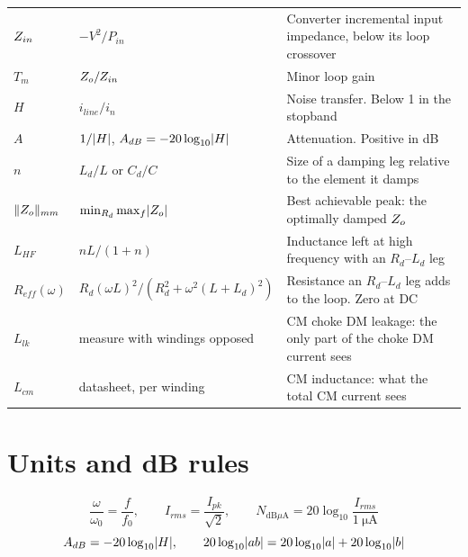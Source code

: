\begin{center}
\begin{tabular}{@{}lp{}p{}@{}}
		$Z_{in}$                 & $-V^2/P_{in}$                                & Converter incremental input impedance, below its loop crossover            \\
		$T_m$                  & $Z_o/Z_{in}$                                   & Minor loop gain                                                            \\
		$H$                    & $i_{line}/i_n$                               & Noise transfer. Below 1 in the stopband                                    \\
		$A$                    & $1/\lvert H\rvert$, $A_{dB} = -20\log_{10}\lvert H\rvert$  & Attenuation. Positive in dB                                                \\
		$n$                    & $L_d/L$ or $C_d/C$                           & Size of a damping leg relative to the element it damps                     \\
		$\lVert Z_o\rVert_{mm}$      & $\min_{R_d}\max_f \lvert Z_o\rvert$                 & Best achievable peak: the optimally damped $Z_o$                           \\
		$L_{HF}$               & $nL/(1+n)$                                   & Inductance left at high frequency with an $R_d$--$L_d$ leg                 \\
		$R_{eff}(\omega)$      & $R_d(\omega L)^2/(R_d^2 + \omega^2(L+L_d)^2)$ & Resistance an $R_d$--$L_d$ leg adds to the loop. Zero at DC               \\
		$L_{lk}$               & measure with windings opposed                & CM choke DM leakage: the only part of the choke DM current sees            \\
		$L_{cm}$               & datasheet, per winding                       & CM inductance: what the total CM current sees                              \\
		\bottomrule
	\end{tabular}
\end{center}

\section{Units and dB rules}

\[
	\frac{\omega}{\omega_0} = \frac{f}{f_0}, \qquad
	I_{rms} = \frac{I_{pk}}{\sqrt{2}}, \qquad
	N_{\text{dB}\mu\text{A}} = 20\log_{10}\frac{I_{rms}}{\qty{1}{\micro\ampere}}
\]
\[
	A_{dB} = -20\log_{10}\lvert H\rvert, \qquad
	20\log_{10}\lvert ab\rvert = 20\log_{10}\lvert a\rvert + 20\log_{10}\lvert b\rvert
\]

